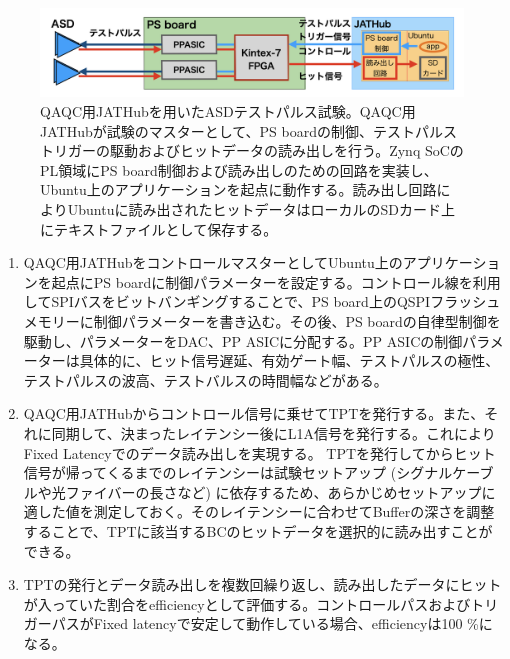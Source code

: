 \begin{figure} 
\centering
\includegraphics[width=16cm]{fig/QAQC/QAQCasdtp.png}
\caption[QAQC用JATHubを用いたASDテストパルス試験]{QAQC用JATHubを用いたASDテストパルス試験。QAQC用JATHubが試験のマスターとして、PS boardの制御、テストパルストリガーの駆動およびヒットデータの読み出しを行う。Zynq SoCのPL領域にPS board制御および読み出しのための回路を実装し、Ubuntu上のアプリケーションを起点に動作する。読み出し回路によりUbuntuに読み出されたヒットデータはローカルのSDカード上にテキストファイルとして保存する。}
\label{QAQCasdtp}
\end{figure}

\begin{enumerate}
    \item QAQC用JATHubをコントロールマスターとしてUbuntu上のアプリケーションを起点にPS boardに制御パラメーターを設定する。コントロール線を利用してSPIバスをビットバンギングすることで、PS board上のQSPIフラッシュメモリーに制御パラメーターを書き込む。その後、PS boardの自律型制御を駆動し、パラメーターをDAC、PP ASICに分配する。PP ASICの制御パラメーターは具体的に、ヒット信号遅延、有効ゲート幅、テストパルスの極性、テストパルスの波高、テストバルスの時間幅などがある。
    \baselineskip

    \item QAQC用JATHubからコントロール信号に乗せてTPTを発行する。また、それに同期して、決まったレイテンシー後にL1A信号を発行する。これによりFixed Latencyでのデータ読み出しを実現する。
    TPTを発行してからヒット信号が帰ってくるまでのレイテンシーは試験セットアップ (シグナルケーブルや光ファイバーの長さなど) に依存するため、あらかじめセットアップに適した値を測定しておく。そのレイテンシーに合わせてBufferの深さを調整することで、TPTに該当するBCのヒットデータを選択的に読み出すことができる。
    \baselineskip

    \item TPTの発行とデータ読み出しを複数回繰り返し、読み出したデータにヒットが入っていた割合をefficiencyとして評価する。コントロールパスおよびトリガーパスがFixed latencyで安定して動作している場合、efficiencyは100 \%になる。
    \baselineskip

\end{enumerate}

